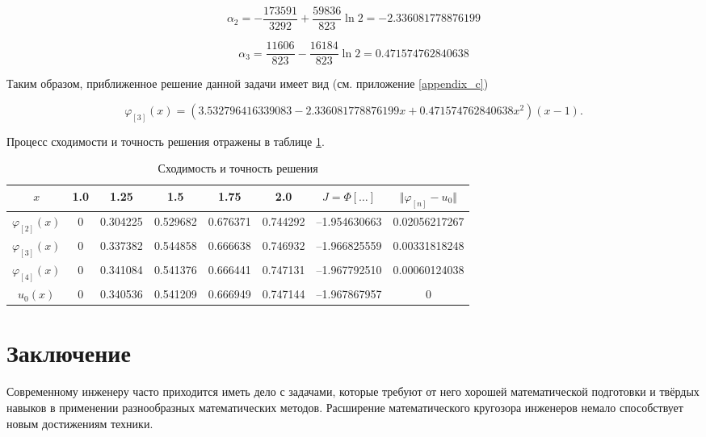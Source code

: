 \documentclass{article}
\begin{document}
\begin{displaymath}
	\alpha_{2} = -\frac{173591}{3292} + \frac{59836}{823}\ln{2} = -2.336081778876199
\end{displaymath}

\begin{displaymath}
	\alpha_{3} = \frac{11606}{823} - \frac{16184}{823}\ln{2} = 0.471574762840638
\end{displaymath}

\noindent Таким образом, приближенное решение данной задачи имеет вид (см. приложение \ref{appendix_c})

\begin{displaymath}
	\varphi_{[3]}(x) = (3.532796416339083 - 2.336081778876199x + 0.471574762840638 x^2)(x-1).
\end{displaymath}

Процесс сходимости и точность решения отражены в таблице \ref{table_process_of_convergence_rank_3}.

\begin{table}[!h]
\centering
\begin{tabular}{|c|c|c|c|c|c|c|c|}
	\hline
	$x$ & 1.0 & 1.25 & 1.5 & 1.75 & 2.0 & $J = \Phi[\ldots]$ & $\Vert \varphi_{[n]} - u_{0} \Vert$ \\
	\hline \hline

	$\varphi_{[2]}(x)$ & 0 & 0.304225 & 0.529682 & 0.676371 & 0.744292 & –1.954630663 & 0.02056217267 \\	\hline
	$\varphi_{[3]}(x)$ & 0 & 0.337382 & 0.544858 & 0.666638 & 0.746932 & –1.966825559 & 0.00331818248 \\	\hline
	$\varphi_{[4]}(x)$ & 
0 & 0.341084 & 0.541376 & 0.666441 & 0.747131 & –1.967792510 & 0.00060124038 \\	\hline
	$u_{0}(x)$ & 0 & 0.340536 & 0.541209 & 0.666949 & 0.747144 & –1.967867957 & 0 \\	\hline

\end{tabular}
\caption{Сходимость и точность решения}
\label{table_process_of_convergence_rank_3}
\end{table}

\newpage

\section*{Заключение}

Современному инженеру часто приходится иметь дело с задачами, которые требуют от него хорошей математической подготовки и твёрдых навыков в применении разнообразных математических методов. Расширение математического кругозора инженеров немало способствует новым достижениям техники.
\end{document}
